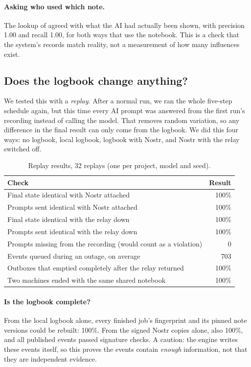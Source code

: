 \documentclass[10pt,a4paper]{article}
\begin{document}
\paragraph{Asking who used which note.} The lookup of  agreed with what the AI had actually
been shown, with precision 1.00 and recall 1.00, for both ways that use the notebook. This is a check that the
system's records match reality, not a measurement of how many influences exist.

\subsection{Does the logbook change anything?}

We tested this with a \emph{replay}. After a normal run, we ran the whole five-step schedule again, but this time
every AI prompt was answered from the first run's recording instead of calling the model. That removes random
variation, so any difference in the final result can only come from the logbook. We did this four ways: no logbook,
local logbook, logbook with Nostr, and Nostr with the relay switched off.

\begin{table}[h]
\centering\small
\caption{Replay results, 32 replays (one per project, model and seed).}
\label{tab:replay}
\begin{tabular}{@{}l r@{}}
\toprule
Check & Result \\
\midrule
Final state identical with Nostr attached & 100\% \\
Prompts sent identical with Nostr attached & 100\% \\
Final state identical with the relay down & 100\% \\
Prompts sent identical with the relay down & 100\% \\
Prompts missing from the recording (would count as a violation) & 0 \\
Events queued during an outage, on average & 703 \\
Outboxes that emptied completely after the relay returned & 100\% \\
Two machines ended with the same shared notebook & 100\% \\
\bottomrule
\end{tabular}
\end{table}

\paragraph{Is the logbook complete?} From the local logbook alone, every finished job's fingerprint and its pinned
note versions could be rebuilt: 100\%. From the signed Nostr copies alone, also 100\%, and all published events
passed signature checks. A caution: the engine writes these events itself, so this proves the events contain
\emph{enough} information, not that they are independent evidence.
\end{document}
